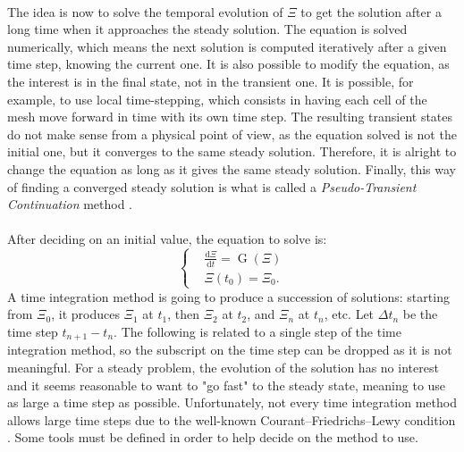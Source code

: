     \paragraph{}
    The idea is now to solve the temporal evolution of $\Xi$ to get the solution after a long time when it approaches the steady solution.
    The equation is solved numerically, which means the next solution is computed iteratively after a given time step, knowing the current one.
    It is also possible to modify the equation, as the interest is in the final state, not in the transient one.
    It is possible, for example, to use local time-stepping, which consists in having each cell of the mesh move forward in time with its own time step.
    The resulting transient states do not make sense from a physical point of view, as the equation solved is not the initial one, but it converges to the same steady solution.
    Therefore, it is alright to change the equation as long as it gives the same steady solution.
    Finally, this way of finding a converged steady solution is what is called a \emph{Pseudo-Transient Continuation} method \cite{KelleyKeyes1996}.

    \paragraph{}
    After deciding on an initial value, the equation to solve is:
    \begin{equation}\label{eq:init_value_ode}
      \left\{\begin{aligned}
        & \frac{\mathrm{d} \Xi}{\mathrm{d}t} = \operatorname{G}\left(\Xi\right) \\
        & \Xi\left(t_0\right) = \Xi_0 .
      \end{aligned}\right.
    \end{equation}
    A time integration method is going to produce a succession of solutions: starting from $\Xi_0$, it produces $\Xi_1$ at $t_1$, then $\Xi_2$ at $t_2$, and $\Xi_n$ at $t_n$, etc.
    Let $\Delta t_n$ be the time step $t_{n+1} - t_n$.
    The following is related to a single step of the time integration method, so the subscript on the time step can be dropped as it is not meaningful.
    For a steady problem, the evolution of the solution has no interest and it seems reasonable to want to "go fast" to the steady state, meaning to use as large a time step as possible.
    Unfortunately, not every time integration method allows large time steps due to the well-known Courant--Friedrichs--Lewy condition \cite{CourantFriedrichsLewy1967}.
    Some tools must be defined in order to help decide on the method to use.


